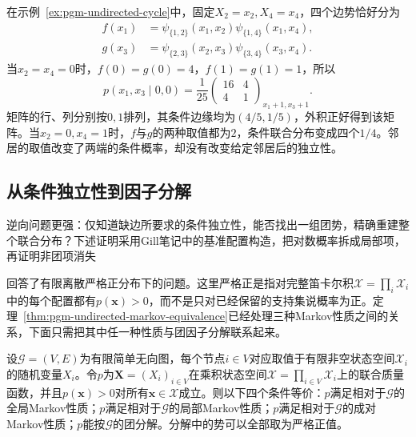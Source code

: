 在示例~\ref{ex:pgm-undirected-cycle}中，固定$X_2=x_2,X_4=x_4$，四个边势恰好分为
\[
  \begin{aligned}
    f(x_1)&=\psi_{\{1,2\}}(x_1,x_2)\psi_{\{1,4\}}(x_1,x_4),\\
    g(x_3)&=\psi_{\{2,3\}}(x_2,x_3)\psi_{\{3,4\}}(x_3,x_4).
  \end{aligned}
\]
当$x_2=x_4=0$时，$f(0)=g(0)=4$，$f(1)=g(1)=1$，所以
\[
  p(x_1,x_3\mid0,0)
  =\frac{1}{25}
    \begin{pmatrix}16&4\\4&1\end{pmatrix}_{x_1+1,x_3+1}.
\]
矩阵的行、列分别按$0,1$排列，其条件边缘均为$(4/5,1/5)$，外积正好得到该矩阵。当$x_2=0,x_4=1$时，$f$与$g$的两种取值都为$2$，条件联合分布变成四个$1/4$。邻居的取值改变了两端的条件概率，却没有改变给定邻居后的独立性。

\subsection{从条件独立性到因子分解}
\label{sec:pgm-undirected-hammersley-clifford}

逆向问题更强：仅知道缺边所要求的条件独立性，能否找出一组团势，精确重建整个联合分布？下述证明采用Gill笔记中的基准配置构造，把对数概率拆成局部项，再证明非团项消失

回答了有限离散严格正分布下的问题。这里严格正是指对完整笛卡尔积$\mathcal{X}=\prod_i\mathcal{X}_i$中的每个配置都有$p(\bm{x})>0$，而不是只对已经保留的支持集说概率为正。定理~\ref{thm:pgm-undirected-markov-equivalence}已经处理三种Markov性质之间的关系，下面只需把其中任一种性质与团因子分解联系起来。

\begin{theorem}
  \label{thm:pgm-undirected-hammersley-clifford}
  设$\mathcal{G}=(V,E)$为有限简单无向图，每个节点$i\in V$对应取值于有限非空状态空间$\mathcal{X}_i$的随机变量$X_i$。令$p$为$\bm{X}=(X_i)_{i\in V}$在乘积状态空间$\mathcal{X}=\prod_{i\in V}\mathcal{X}_i$上的联合质量函数，并且$p(\bm{x})>0$对所有$\bm{x}\in\mathcal{X}$成立。则以下四个条件等价：$p$满足相对于$\mathcal{G}$的全局Markov性质；$p$满足相对于$\mathcal{G}$的局部Markov性质；$p$满足相对于$\mathcal{G}$的成对Markov性质；$p$能按$\mathcal{G}$的团分解。分解中的势可以全部取为严格正值。
\end{theorem}

